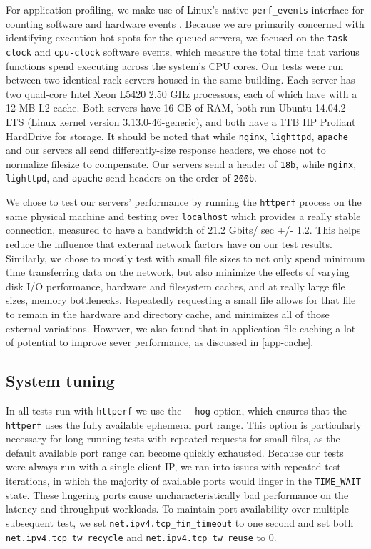 \documentclass[twoside,10pt]{article}
\begin{document}
\begin{multicols}{2}
For application profiling, we make use of Linux's native
\verb+perf_events+ interface for counting software and hardware events
\cite{weaver2013linux}. Because we are primarily concerned with
identifying execution hot-spots for the queued servers, we focused on
the \verb+task-clock+ and \verb+cpu-clock+ software events, which
measure the total time that various functions spend executing across
the system's CPU cores. 
Our tests were run between two identical rack servers housed in the
same building. Each server has two quad-core Intel Xeon L5420 2.50 GHz
processors, each of which have with a 12 MB L2 cache. Both servers
have 16 GB of RAM, both run Ubuntu 14.04.2 LTS (Linux kernel version
3.13.0-46-generic), and both have a 1TB HP Proliant HardDrive for
storage.
It should be noted that while \verb+nginx+, \verb+lighttpd+,
\verb+apache+ and our servers all send differently-size response
headers, we chose not to normalize filesize to compensate. Our servers
send a header of \verb+18b+, while \verb+nginx+, \verb+lighttpd+, and
\verb+apache+ send headers on the order of \verb+200b+.

We chose to test our servers' performance by running the
\verb+httperf+ process on the same physical machine and testing over
\verb+localhost+ which provides a really stable connection, measured
to have a bandwidth of 21.2 Gbits/ sec +/- 1.2. This helps reduce the
influence that external network factors have on our test
results. Similarly, we chose to mostly test with small file sizes to
not only spend minimum time transferring data on the network, but also
minimize the effects of varying disk I/O performance, hardware and
filesystem caches, and at really large file sizes, memory
bottlenecks. Repeatedly requesting a small file allows for that file
to remain in the hardware and directory cache, and minimizes all of
those external variations. However, we also found that in-application
file caching a lot of potential to improve sever performance, as
discussed in \ref{app-cache}.

\subsection{System tuning}

In all tests run with \verb+httperf+ we use the \verb+--hog+ option,
which ensures that the \verb+httperf+ uses the fully available
ephemeral port range. This option is particularly necessary for
long-running tests with repeated requests for small files, as the
default available port range can become quickly exhausted. Because our
tests were always run with a single client IP, we ran into issues with
repeated test iterations, in which the majority of available ports
would linger in the \verb+TIME_WAIT+ state. These lingering ports
cause uncharacteristically bad performance on the latency and
throughput workloads. To maintain port availability over multiple
subsequent test, we set \verb+net.ipv4.tcp_fin_timeout+ to one second
and set both \verb+net.ipv4.tcp_tw_recycle+ and
\verb+net.ipv4.tcp_tw_reuse+ to 0.


\end{multicols}
\end{document}
